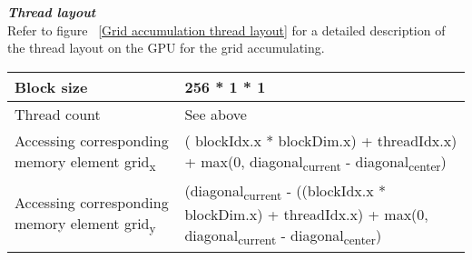 \documentclass[11pt]{IEEEtran}
\begin{document}
\textit{\textbf{Thread layout}}\\[1\baselineskip] 
Refer to figure ~\ref{Grid accumulation thread layout} for a detailed description of the thread layout on the GPU for the grid accumulating.
  \begin{figure*}[ht]
  \caption[Accumulating thread layout]{Thread layout for grid accumulating}
  \label{Grid accumulation thread layout}
  \begin{center}	
    \begin{tabular}{|p{4cm}|p{12cm}|}
	\hline
	Block size & 256 * 1 * 1\\
	\hline
	Thread count & See above\\
	\hline
	Accessing corresponding memory element grid\textsubscript{x} &( blockIdx.x * blockDim.x) + threadIdx.x) + max(0, diagonal\textsubscript{current} - diagonal\textsubscript{center})\\
	\hline
	Accessing corresponding memory element grid\textsubscript{y} & (diagonal\textsubscript{current} - ((blockIdx.x * blockDim.x) + threadIdx.x) + max(0, diagonal\textsubscript{current} - diagonal\textsubscript{center})\\
	\hline
	\end{tabular}
   \end{center}
   \end{figure*}

\end{document}
